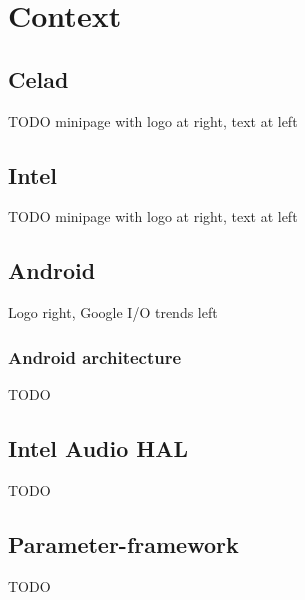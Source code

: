 %
%

\section{Context}

\subsection{Celad}
\begin{FrameWithSubSection}
    TODO minipage with logo at right, text at left
\end{FrameWithSubSection}

\subsection{Intel}
\begin{FrameWithSubSection}
    TODO minipage with logo at right, text at left
\end{FrameWithSubSection}

\subsection{Android}
\begin{FrameWithSubSection}
    Logo right, Google I/O trends left
\end{FrameWithSubSection}
\begin{FrameWithSubSection}
    \frametitle{Android architecture}
    TODO 
\end{FrameWithSubSection}

\subsection{Intel Audio HAL}
\begin{FrameWithSubSection}
    TODO
\end{FrameWithSubSection}

\subsection{Parameter-framework}
\begin{FrameWithSubSection}
    TODO
\end{FrameWithSubSection}
